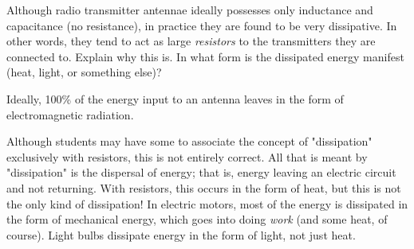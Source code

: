 

Although radio transmitter antennae ideally possesses only inductance and capacitance (no resistance), in practice they are found to be very dissipative.  In other words, they tend to act as large {\it resistors} to the transmitters they are connected to.  Explain why this is.  In what form is the dissipated energy manifest (heat, light, or something else)?







Ideally, 100\% of the energy input to an antenna leaves in the form of electromagnetic radiation.







Although students may have some to associate the concept of "dissipation" exclusively with resistors, this is not entirely correct.  All that is meant by "dissipation" is the dispersal of energy; that is, energy leaving an electric circuit and not returning.  With resistors, this occurs in the form of heat, but this is not the only kind of dissipation!  In electric motors, most of the energy is dissipated in the form of mechanical energy, which goes into doing {\it work} (and some heat, of course).  Light bulbs dissipate energy in the form of light, not just heat.




